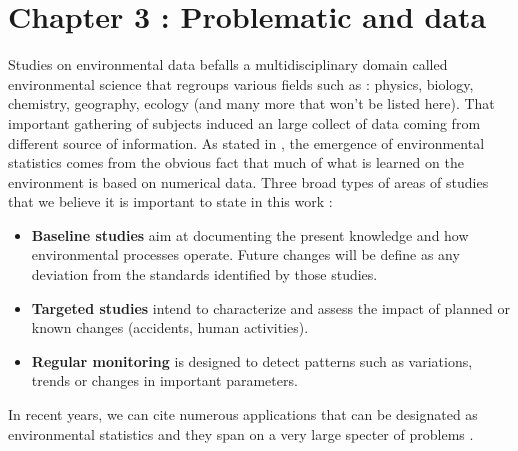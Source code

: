 \chapter{Chapter 3 : Problematic and data}\label{chp:3}

\minitoc

Studies on environmental data befalls a multidisciplinary domain called environmental science that regroups various fields such as : physics, biology, chemistry, geography, ecology (and many more that won't be listed here). That important gathering of subjects induced an large collect of data coming from different source of information. As stated in \cite{Manly2008}, the emergence of environmental statistics comes from the obvious fact that much of what is learned on the environment is based on numerical data. Three broad types of areas of studies that we believe it is important to state in this work : 

\begin{itemize}
    \item \textbf{Baseline studies} aim at documenting the present knowledge and how environmental processes operate. Future changes will be define as any deviation from the standards identified by those studies.
    \item \textbf{Targeted studies} intend to characterize and assess the impact of planned or known changes (accidents, human activities). 
    \item \textbf{Regular monitoring} is designed to detect patterns such as variations, trends or changes in important parameters.  
\end{itemize}
In recent years, we can cite numerous applications that can be designated as environmental statistics and they span on a very large specter of problems \cite{BUNCE_2018,Harvell1999,Hoeoek2013,Zheng2021,Zhao2010,Shi2022,Ozgul2010,Mori2012}. 


